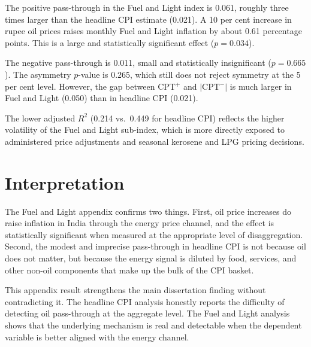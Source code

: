 The positive pass-through in the Fuel and Light index is 0.061, roughly three times larger than the headline CPI estimate (0.021). A 10 per cent increase in rupee oil prices raises monthly Fuel and Light inflation by about 0.61 percentage points. This is a large and statistically significant effect ($p = 0.034$).

The negative pass-through is 0.011, small and statistically insignificant ($p = 0.665$). The asymmetry $p$-value is 0.265, which still does not reject symmetry at the 5 per cent level. However, the gap between CPT$^+$ and $|$CPT$^-|$ is much larger in Fuel and Light (0.050) than in headline CPI (0.021).

The lower adjusted $R^2$ (0.214 vs.\ 0.449 for headline CPI) reflects the higher volatility of the Fuel and Light sub-index, which is more directly exposed to administered price adjustments and seasonal kerosene and LPG pricing decisions.

\section{Interpretation}

The Fuel and Light appendix confirms two things. First, oil price increases do raise inflation in India through the energy price channel, and the effect is statistically significant when measured at the appropriate level of disaggregation. Second, the modest and imprecise pass-through in headline CPI is not because oil does not matter, but because the energy signal is diluted by food, services, and other non-oil components that make up the bulk of the CPI basket.

This appendix result strengthens the main dissertation finding without contradicting it. The headline CPI analysis honestly reports the difficulty of detecting oil pass-through at the aggregate level. The Fuel and Light analysis shows that the underlying mechanism is real and detectable when the dependent variable is better aligned with the energy channel.
